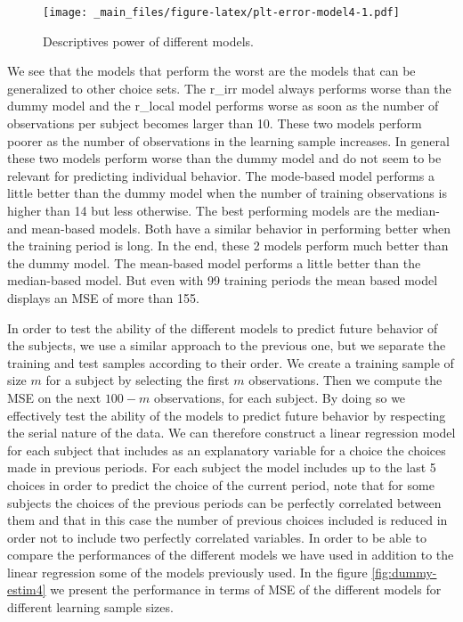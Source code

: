 \documentclass[
]{book}
\begin{document}
\begin{figure}
\centering
\texttt{[image: \_main\_files/figure-latex/plt-error-model4-1.pdf]}
\caption{\label{fig:plt-error-model4}Descriptives power of different models.}
\end{figure}

We see that the models that perform the worst are the models that can be
generalized to other choice sets. The r\_irr model always performs worse
than the dummy model and the r\_local model performs worse as soon as the
number of observations per subject becomes larger than 10. These two
models perform poorer as the number of observations in the learning
sample increases. In general these two models perform worse than the
dummy model and do not seem to be relevant for predicting individual
behavior. The mode-based model performs a little better than the dummy
model when the number of training observations is higher than 14 but
less otherwise. The best performing models are the median- and mean-based
models. Both have a similar behavior in performing better when the
training period is long. In the end, these 2 models perform much better
than the dummy model. The mean-based model performs a little better than
the median-based model. But even with 99 training periods the mean based
model displays an MSE of more than 155.

In order to test the ability of the different models to predict
future behavior of the subjects, we use a similar approach to the
previous one, but we separate the training and test samples according to
their order. We create a training sample of size \(m\) for a subject by
selecting the first \(m\) observations. Then we compute the MSE on the next
\(100-m\) observations, for each subject. By doing so we effectively test
the ability of the models to predict future behavior by respecting the
serial nature of the data. We can therefore construct a linear regression
model for each subject that includes as an explanatory variable for a
choice the choices made in previous periods. For each subject the model
includes up to the last 5 choices in order to predict the choice of the
current period, note that for some subjects the choices of the previous
periods can be perfectly correlated between them and that in this case
the number of previous choices included is reduced in order not to
include two perfectly correlated variables. In order to be
able to compare the performances of the different models we have used in
addition to the linear regression some of the models previously used. In
the figure \ref{fig:dummy-estim4} we present the performance in terms of MSE of
the different models for different learning sample sizes.
\end{document}
